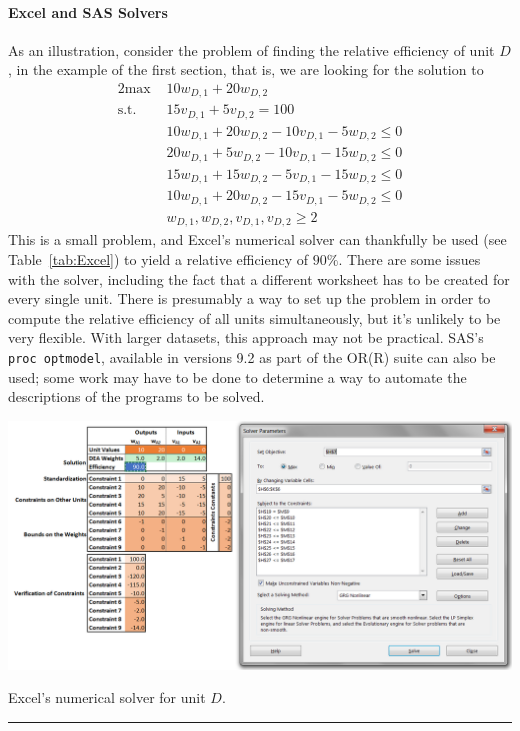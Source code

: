     \paragraph{Excel and SAS Solvers}
As an illustration, consider the problem of finding the relative efficiency of unit $D$, in the example of the first section, that is, we are looking for the solution to 
  \begin{alignat*}{2}
    \text{max }   & 10w_{D,1}+20w_{D,2} \\
    \text{s.t. } & 15v_{D,1}+5v_{D,2} = 100 \\
                       & 10w_{D,1}+20w_{D,2}-10v_{D,1}-5w_{D,2}\leq 0 \\
                       & 20w_{D,1}+5w_{D,2}-10v_{D,1}-15w_{D,2}\leq 0 \\
                       & 15w_{D,1}+15w_{D,2}-5v_{D,1}-15w_{D,2}\leq 0 \\
                       & 10w_{D,1}+20w_{D,2}-15v_{D,1}-5w_{D,2}\leq 0 \\
                       & w_{D,1},w_{D,2},v_{D,1},v_{D,2}\geq 2
  \end{alignat*}
This is a small problem, and Excel's numerical solver can thankfully be used (see Table~\ref{tab:Excel}) to yield a relative efficiency of $90\%$. There are some issues with the solver, including the fact that a different worksheet has to be created for every single unit. There is presumably a way to set up the problem in order to compute the relative efficiency of all units simultaneously, but it's unlikely to be very flexible. With larger datasets, this approach may not be practical. 
\newl SAS's \texttt{proc optmodel}, available in versions 9.2 as part of the OR(R) suite can also be used; some work may have to be done to determine a way to automate the descriptions of the programs to be solved.    
\begin{table}[t]
  \begin{center}
    \includegraphics[width=\textwidth]{images/OPT/DEA3}
  \end{center}
  \caption{\small Excel's numerical solver for unit $D$.}\hrule
  \label{tab:Excel}
\end{table}
